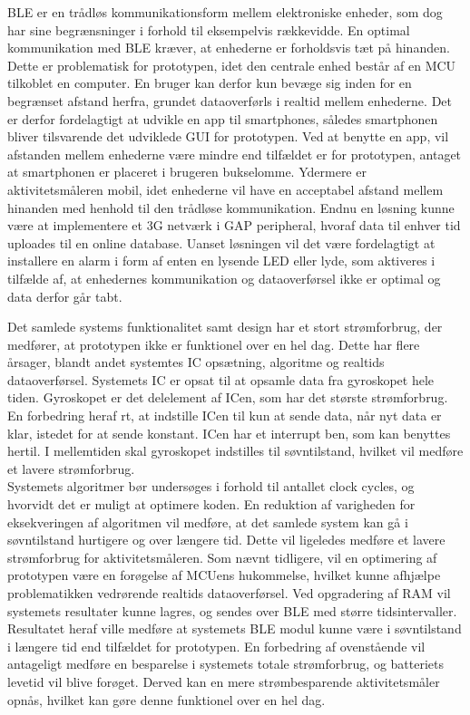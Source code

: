 BLE er en trådløs kommunikationsform mellem elektroniske enheder, som dog har sine begrænsninger i forhold til eksempelvis rækkevidde. En optimal kommunikation med BLE kræver, at enhederne er forholdsvis tæt på hinanden. Dette er problematisk for prototypen, idet den centrale enhed består af en MCU tilkoblet en computer. En bruger kan derfor kun bevæge sig inden for en begrænset afstand herfra, grundet dataoverførls i realtid mellem enhederne. Det er derfor fordelagtigt at udvikle en app til smartphones, således smartphonen bliver tilsvarende det udviklede GUI for prototypen. Ved at benytte en app, vil afstanden mellem enhederne være mindre end tilfældet er for prototypen, antaget at smartphonen er placeret i brugeren bukselomme. Ydermere er aktivitetsmåleren mobil, idet enhederne vil have en acceptabel afstand mellem hinanden med henhold til den trådløse kommunikation. Endnu en løsning kunne være at implementere et 3G netværk i GAP peripheral, hvoraf data til enhver tid uploades til en online database. Uanset løsningen vil det være fordelagtigt at installere en alarm i form af enten en lysende LED eller lyde, som aktiveres i tilfælde af, at enhedernes kommunikation og dataoverførsel ikke er optimal og data derfor går tabt. 

Det samlede systems funktionalitet samt design har et stort strømforbrug, der medfører, at prototypen ikke er funktionel over en hel dag. Dette har flere årsager, blandt andet systemtes IC opsætning, algoritme og realtids dataoverførsel. Systemets IC er opsat til at opsamle data fra gyroskopet hele tiden. Gyroskopet er det delelement af ICen, som har det største strømforbrug. En forbedring heraf rt, at indstille ICen til kun at sende data, når nyt data er klar, istedet for at sende konstant. ICen har et interrupt ben, som kan benyttes hertil. I mellemtiden skal gyroskopet indstilles til søvntilstand, hvilket vil medføre et lavere strømforbrug. \\
Systemets algoritmer bør undersøges i forhold til antallet clock cycles, og hvorvidt det er muligt at optimere koden. En reduktion af varigheden for eksekveringen af algoritmen vil medføre, at det samlede system kan gå i søvntilstand hurtigere og over længere tid. Dette vil ligeledes medføre et lavere strømforbrug for aktivitetsmåleren. Som nævnt tidligere, vil en optimering af prototypen være en forøgelse af MCUens hukommelse, hvilket kunne afhjælpe problematikken vedrørende realtids dataoverførsel. Ved opgradering af RAM vil systemets resultater kunne lagres, og sendes over BLE med større tidsintervaller. Resultatet heraf ville medføre at systemets BLE modul kunne være i søvntilstand i længere tid end tilfældet for prototypen. En forbedring af ovenstående vil antageligt medføre en besparelse i systemets totale strømforbrug, og batteriets levetid vil blive forøget. Derved kan en mere strømbesparende aktivitetsmåler opnås, hvilket kan gøre denne funktionel over en hel dag.

